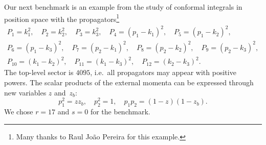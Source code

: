 \documentclass[11pt,a4paper,DIV=11,numbers=noenddot,parskip=half]{scrartcl}
\begin{document}
Our next benchmark is an example from the study of conformal integrals in position space with the propagators\footnote{
Many thanks to Raul João Pereira for this example.}
\begin{equation}
  \begin{gathered}
    P_1 = k_1^2,\quad
    P_2 = k_2^2,\quad
    P_3 = k_3^2,\quad
    P_4 = (p_1-k_1)^2,\quad
    P_5 = (p_1-k_2)^2,\\
    P_6 = (p_1-k_3)^2,\quad
    P_7 = (p_2-k_1)^2,\quad
    P_8 = (p_2-k_2)^2,\quad
    P_9 = (p_2-k_3)^2,\\
    P_{10} = (k_1-k_2)^2,\quad
    P_{11} = (k_1-k_3)^2,\quad
    P_{12} = (k_2-k_3)^2.
  \end{gathered}
  \label{eq:topoRaul_prop}
\end{equation}
The top-level sector is $4095$, i.e.\ all propagators may appear with positive powers.
The scalar products of the external momenta can be expressed through new variables $z$ and~$z_b$:
\begin{equation}
  p_1^2=z z_b , \quad p_2^2 = 1, \quad p_1 p_2 = (1-z)(1-z_b).
\end{equation}
We chose $r = 17$ and $s = 0$ for the benchmark.
\end{document}
